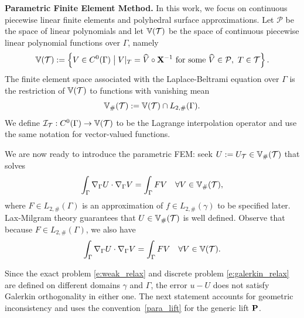 \medskip\noindent
{\bf Parametric Finite Element Method.} %
%
In this work, we focus on continuous piecewise linear finite elements and
polyhedral surface approximations.
Let $\mathcal P$ be the space of linear polynomials and let $\mathbb{V}(\mathcal{T})$ be the
space of continuous piecewise linear polynomial functions over $\Gamma$, namely
%
\begin{equation*}
\mathbb{V}(\mathcal{T}) :=\left\lbrace V \in C^0(\Gamma)  \;\big|\; 
	   V|_{T}  = \widehat V \circ {\bf X}^{-1} \mbox{ for some } \widehat V\in \mathcal P, ~T \in \mathcal{T}\right\rbrace.
\end{equation*}
%
The finite element space associated with the Laplace-Beltrami equation over
$\Gamma$ is the restriction of $\mathbb{V}(\mathcal{T})$ to functions with vanishing mean
%
\[
\mathbb{V}_\#(\mathcal{T}):= \mathbb{V}(\mathcal{T}) \cap L_{2,\#}(\Gamma).
\]
%
We define $\mathcal{I}_{\mathcal{T}}: C^0(\Gamma) \to \mathbb{V}(\mathcal{T})$ to be the Lagrange interpolation operator
and use the same notation for vector-valued functions.

We are now ready to introduce the parametric FEM: seek $U:=U_{\mathcal{T}} \in \mathbb{V}_\#(\mathcal{T})$
that solves
\begin{equation}\label{e:galerkin}
  \int_\Gamma \nabla_\Gamma U \cdot \nabla_\Gamma V = \int_\Gamma F V
  \quad \forall V \in \mathbb{V}_\#(\mathcal{T}),
\end{equation}
where $F \in L_{2,\#}(\Gamma)$ is an approximation of $f \in L_{2,\#}(\gamma)$ to be specified later.
Lax-Milgram theory guarantees that $U \in \mathbb{V}_\#(\mathcal{T})$ is well defined. 
Observe that because $F \in L_{2,\#}(\Gamma)$, we also have
\begin{equation}\label{e:galerkin_relax}
  \int_\Gamma \nabla_\Gamma U \cdot \nabla_\Gamma V = \int_\Gamma F V
  \quad \forall V \in \mathbb{V}(\mathcal{T}).
\end{equation}


Since the exact problem \eqref{e:weak_relax} and discrete problem \eqref{e:galerkin_relax}
are defined on different domains $\gamma$ and $\Gamma$, the error $u-U$ does not
satisfy Galerkin orthogonality in either one. The next statement accounts for
geometric inconsistency and uses the convention~\eqref{para_lift} for the
generic lift ${\bf P}$.

